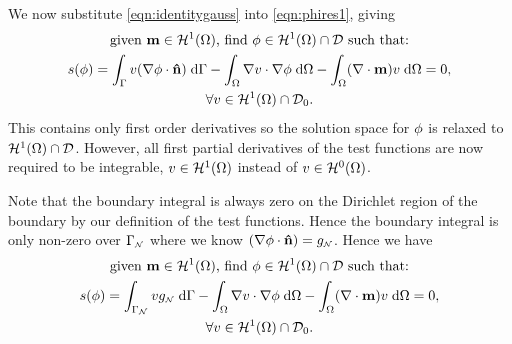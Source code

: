 We now substitute \eqref{eqn:identitygauss} into \eqref{eqn:phires1}, giving
\begin{gather}
  \text{given $\mathbf{m} \in \mathcal{H}^1(\Omega)$, find $\phi \in \mathcal{H}^1(\Omega) \cap \mathcal{D}$ such that:} \notag \\
  s(\phi) = \int_{{\Gamma}} v (\nabla \phi \cdot \mathbf{\hat{n}}) {\; \text{d}} {\Gamma}
  - \int_\Omega \nabla v \cdot \nabla \phi {\; \text{d}} \Omega
  - \int_\Omega (\nabla \cdot \mathbf{m}) v {\; \text{d}} \Omega = 0
  , \notag \\
  \forall v \in \mathcal{H}^1(\Omega) \cap \mathcal{D}_0. \notag
\end{gather}
This contains only first order derivatives so the solution space for $\phi$ is relaxed to $\mathcal{H}^1(\Omega) \cap \mathcal{D}$. However, all first partial derivatives of the test functions are now required to be integrable, \ie $v \in \mathcal{H}^1(\Omega)$ instead of $v \in \mathcal{H}^0(\Omega)$.

Note that the boundary integral is always zero on the Dirichlet region of the boundary by our definition of the test functions. Hence the boundary integral is only non-zero over ${\Gamma}_{{\scriptscriptstyle{\mathcal{N}}}}$ where we know $(\nabla \phi \cdot \mathbf{\hat{n}}) = g_{{\scriptscriptstyle{\mathcal{N}}}}$. Hence we have
\begin{gather}
  \text{given $\mathbf{m} \in \mathcal{H}^1(\Omega)$, find $\phi \in \mathcal{H}^1(\Omega) \cap \mathcal{D}$ such that:} \notag \\
  s(\phi) = \int_{{\Gamma}_{\scriptscriptstyle{\mathcal{N}}}} v g_{\scriptscriptstyle{\mathcal{N}}} {\; \text{d}} {\Gamma}
  - \int_\Omega \nabla v \cdot \nabla \phi {\; \text{d}} \Omega
  - \int_\Omega (\nabla \cdot \mathbf{m}) v {\; \text{d}} \Omega = 0
  , \label{res:contphi} \\
  \forall v \in \mathcal{H}^1(\Omega) \cap \mathcal{D}_0. \notag
\end{gather}




